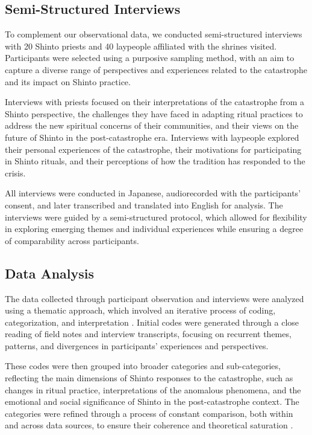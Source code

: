 \documentclass[12pt, a4paper]{article}
\begin{document}
\subsection{Semi-Structured Interviews}
To complement our observational data, we conducted semi-structured interviews with 20 Shinto priests and 40 laypeople affiliated with the shrines visited. Participants were selected using a purposive sampling method, with an aim to capture a diverse range of perspectives and experiences related to the catastrophe and its impact on Shinto practice.

Interviews with priests focused on their interpretations of the catastrophe from a Shinto perspective, the challenges they have faced in adapting ritual practices to address the new spiritual concerns of their communities, and their views on the future of Shinto in the post-catastrophe era. Interviews with laypeople explored their personal experiences of the catastrophe, their motivations for participating in Shinto rituals, and their perceptions of how the tradition has responded to the crisis.

All interviews were conducted in Japanese, audiorecorded with the participants' consent, and later transcribed and translated into English for analysis. The interviews were guided by a semi-structured protocol, which allowed for flexibility in exploring emerging themes and individual experiences while ensuring a degree of comparability across participants.

\subsection{Data Analysis}
The data collected through participant observation and interviews were analyzed using a thematic approach, which involved an iterative process of coding, categorization, and interpretation \citep{braun2006}. Initial codes were generated through a close reading of field notes and interview transcripts, focusing on recurrent themes, patterns, and divergences in participants' experiences and perspectives.

These codes were then grouped into broader categories and sub-categories, reflecting the main dimensions of Shinto responses to the catastrophe, such as changes in ritual practice, interpretations of the anomalous phenomena, and the emotional and social significance of Shinto in the post-catastrophe context. The categories were refined through a process of constant comparison, both within and across data sources, to ensure their coherence and theoretical saturation \citep{glaser1968}.
\end{document}
